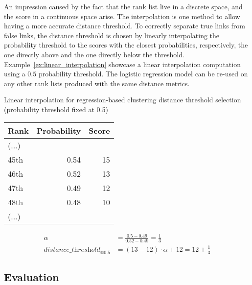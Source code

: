 An impression caused by the fact that the rank list live in a discrete space, and the score in a continuous space arise.
The interpolation is one method to allow having a more accurate distance threshold.
To correctly separate true links from false links, the distance threshold is chosen by linearly interpolating the probability threshold to the scores with the closest probabilities, respectively, the one directly above and the one directly below the threshold.
Example~\ref{ex:linear_interpolation} showcase a linear interpolation computation using a $0.5$ probability threshold.
The logistic regression model can be re-used on any other rank lists produced with the same distance metrics.

\begin{example}
  \centering
  \caption{Linear interpolation for regression-based clustering distance threshold selection (probability threshold fixed at 0.5)}
  \label{ex:linear_interpolation}

  \begin{subexample}{\linewidth}
    \centering
    \begin{tabular}{l r r}
      \toprule
      Rank & Probability & Score \\
      \midrule
      (...) & &\\
      45th & 0.54 & 15 \\
      46th & 0.52 & 13 \\
      47th & 0.49 & 12 \\
      48th & 0.48 & 10 \\
      (...) & & \\
      \bottomrule
    \end{tabular}
  \end{subexample}

  \vspace{0.5cm}

  \begin{subexample}{\linewidth}
    \centering
    \begin{align}
        \alpha &= \frac{0.5 - 0.49}{0.52 - 0.49} = \frac{1}{3} \\
        \textit{distance\_threshold}_{@0.5} &= (13 - 12) \cdot \alpha + 12 = 12 + \frac{1}{3}
    \end{align}
  \end{subexample}
\end{example}


\subsection{Evaluation}

